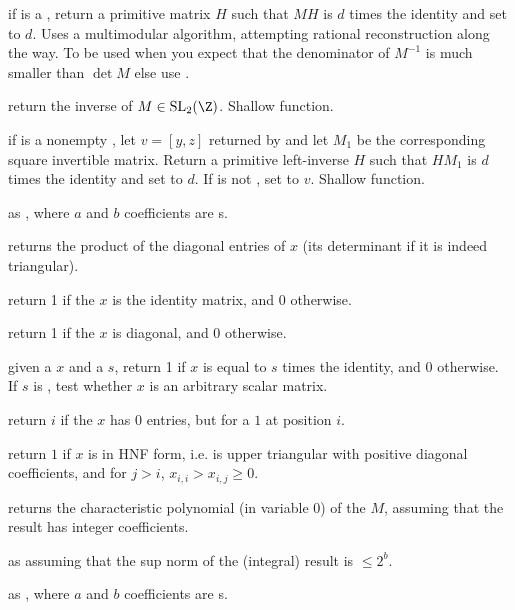  if  is a ,
return a primitive matrix $H$ such that $M H$ is $d$ times the identity
and set  to $d$. Uses a multimodular algorithm, attempting
rational reconstruction along the way. To be used when you expect that the
denominator of $M^{-1}$ is much smaller than $\det M$ else use .

 return the inverse of $M \in
\text{SL}_2(\Z)$. Shallow function.

 if  is a nonempty
, let $v = [y,z]$ returned by  and
let $M_1$ be the corresponding square invertible matrix.
Return a primitive left-inverse $H$ such that $H M_1$ is
$d$ times the identity and set  to $d$. If  is not
, set  to $v$. Shallow function.

 as , where $a$ and $b$
coefficients are s.

 returns the product of the diagonal
entries of $x$ (its determinant if it is indeed triangular).

 return 1 if the  $x$ is the
identity matrix, and 0 otherwise.

 return 1 if the  $x$ is diagonal,
and 0 otherwise.

 given a  $x$ and a
 $s$, return 1 if $x$ is equal to $s$ times the identity, and 0
otherwise. If $s$ is , test whether $x$ is an arbitrary scalar
matrix.

 return $i$ if the  $x$ has $0$ entries,
but for a $1$ at position $i$.

 return $1$ if $x$ is in HNF form, i.e. is upper
triangular with positive diagonal coefficients, and  for $j>i$,
$x_{i,i}>x_{i,j} \ge 0$.


 returns the characteristic polynomial
(in variable $0$) of the  $M$, assuming that the result has integer
coefficients.

 as 
assuming that the sup norm of the (integral) result is $\leq 2^b$.

 as , where $a$ and $b$
coefficients are s.

